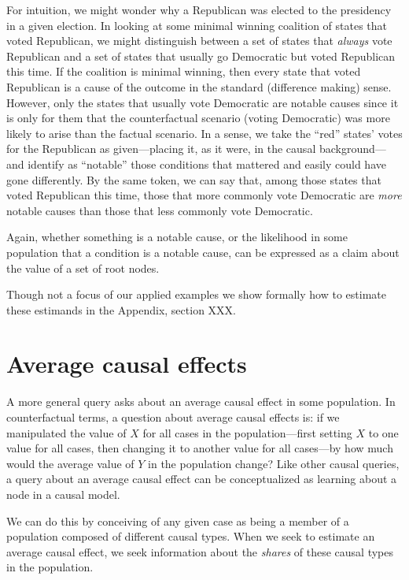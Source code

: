 \documentclass[12pt,]{book}
\begin{document}
For intuition, we might wonder why a Republican was elected to the presidency in a given election. In looking at some minimal winning coalition of states that voted Republican, we might distinguish between a set of states that \emph{always} vote Republican and a set of states that usually go Democratic but voted Republican this time. If the coalition is minimal winning, then every state that voted Republican is a cause of the outcome in the standard (difference making) sense. However, only the states that usually vote Democratic are notable causes since it is only for them that the counterfactual scenario (voting Democratic) was more likely to arise than the factual scenario. In a sense, we take the ``red'' states' votes for the Republican as given---placing it, as it were, in the causal background---and identify as ``notable'' those conditions that mattered and easily could have gone differently. By the same token, we can say that, among those states that voted Republican this time, those that more commonly vote Democratic are \emph{more} notable causes than those that less commonly vote Democratic.

Again, whether something is a notable cause, or the likelihood in some population that a condition is a notable cause, can be expressed as a claim about the value of a set of root nodes.

Though not a focus of our applied examples we show formally how to estimate these estimands in the Appendix, section XXX.

\hypertarget{average-causal-effects}{%
\section{Average causal effects}\label{average-causal-effects}}

A more general query asks about an average causal effect in some population. In counterfactual terms, a question about average causal effects is: if we manipulated the value of \(X\) for all cases in the population---first setting \(X\) to one value for all cases, then changing it to another value for all cases---by how much would the average value of \(Y\) in the population change? Like other causal queries, a query about an average causal effect can be conceptualized as learning about a node in a causal model.

We can do this by conceiving of any given case as being a member of a population composed of different causal types. When we seek to estimate an average causal effect, we seek information about the \emph{shares} of these causal types in the population.
\end{document}
